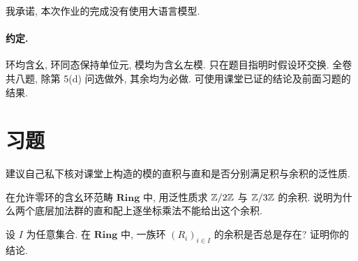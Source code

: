 \documentclass{article}
\begin{document}
{\heiti 我承诺, 本次作业的完成没有使用大语言模型.}

\paragraph{约定.} 环均含幺, 环同态保持单位元, 模均为含幺左模. 只在题目指明时假设环交换. 全卷共八题, 除第 5(d) 问选做外, 其余均为必做. 可使用课堂已证的结论及前面习题的结果.

\section*{习题}

\begin{problem}
建议自己私下核对课堂上构造的模的直积与直和是否分别满足积与余积的泛性质.

在允许零环的含幺环范畴 $\mathbf{Ring}$ 中, 用泛性质求 $\mathbb{Z}/2\mathbb{Z}$ 与 $\mathbb{Z}/3\mathbb{Z}$ 的余积. 说明为什么两个底层加法群的直和配上逐坐标乘法不能给出这个余积.

设 $I$ 为任意集合. 在 $\mathbf{Ring}$ 中, 一族环 $(R_i)_{i\in I}$ 的余积是否总是存在? 证明你的结论.
\end{problem}
\end{document}
